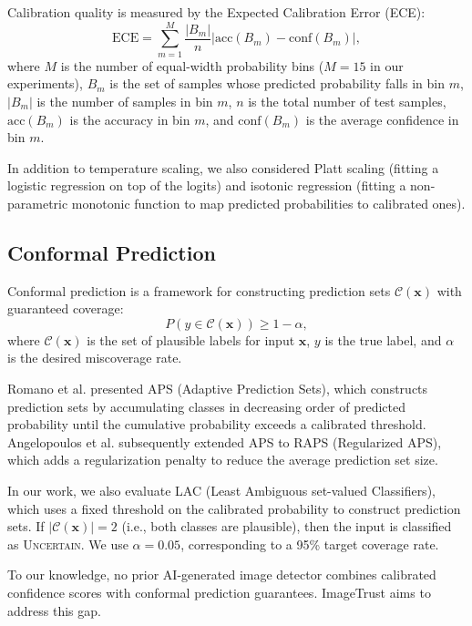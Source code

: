 \documentclass[12pt,a4paper]{book}
\theoremstyle{definition}
\theoremstyle{remark}
\begin{document}
Calibration quality is measured by the Expected Calibration Error (ECE):
\begin{equation}
\text{ECE} = \sum_{m=1}^{M} \frac{|B_m|}{n} \bigl|\text{acc}(B_m) - \text{conf}(B_m)\bigr|,
\label{eq:ece}
\end{equation}
where $M$ is the number of equal-width probability bins ($M{=}15$ in our experiments), $B_m$ is the set of samples whose predicted probability falls in bin $m$, $|B_m|$ is the number of samples in bin $m$, $n$ is the total number of test samples, $\text{acc}(B_m)$ is the accuracy in bin $m$, and $\text{conf}(B_m)$ is the average confidence in bin $m$.

In addition to temperature scaling, we also considered Platt scaling (fitting a logistic regression on top of the logits) and isotonic regression (fitting a non-parametric monotonic function to map predicted probabilities to calibrated ones).


\subsection{Conformal Prediction}\label{sec:conformal-related}

Conformal prediction is a framework for constructing prediction sets $\mathcal{C}(\mathbf{x})$ with guaranteed coverage:
\begin{equation}
P(y \in \mathcal{C}(\mathbf{x})) \geq 1 - \alpha,
\end{equation}
where $\mathcal{C}(\mathbf{x})$ is the set of plausible labels for input $\mathbf{x}$, $y$ is the true label, and $\alpha$ is the desired miscoverage rate.

Romano et al. \cite{romano2020classification} presented APS (Adaptive Prediction Sets), which constructs prediction sets by accumulating classes in decreasing order of predicted probability until the cumulative probability exceeds a calibrated threshold. Angelopoulos et al. \cite{angelopoulos2021uncertainty} subsequently extended APS to RAPS (Regularized APS), which adds a regularization penalty to reduce the average prediction set size.

In our work, we also evaluate LAC (Least Ambiguous set-valued Classifiers), which uses a fixed threshold on the calibrated probability to construct prediction sets. If $|\mathcal{C}(\mathbf{x})| = 2$ (i.e., both classes are plausible), then the input is classified as \textsc{Uncertain}. We use $\alpha{=}0.05$, corresponding to a 95\% target coverage rate.

To our knowledge, no prior AI-generated image detector combines calibrated confidence scores with conformal prediction guarantees. ImageTrust aims to address this gap.
\end{document}
